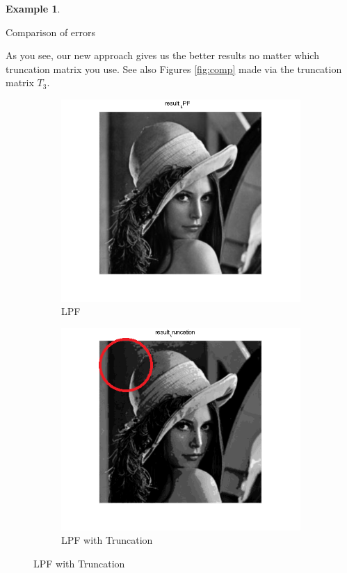 \documentclass[12pt]{amsart}
\theoremstyle{definition}
\newtheorem{ex}[thm]{Example}
\theoremstyle{remark}
\numberwithin{thm}{section}
\begin{document}
\begin{ex}
\begin{table}[ht]
\begin{center}
\caption{Comparison of errors}
\label{table:comparison_of_errors}
\end{center}
\end{table}
As you see, our new approach gives us the better results no matter which truncation matrix you use.
See also Figures \ref{fig:comp} made via the truncation matrix $T_3$.
\begin{figure}[h] \centering 
\begin{subfigure}[b]{0.3\textwidth} \includegraphics[width=\textwidth]{LPF.png} \caption{LPF} \label{fig:LPF} \end{subfigure}
\begin{subfigure}[b]{0.3\textwidth} \includegraphics[width=\textwidth]{truncation.png} \caption{LPF with Truncation} \label{fig:LPF with Truncation} \end{subfigure}

\end{figure}
\end{ex}
\end{document}
